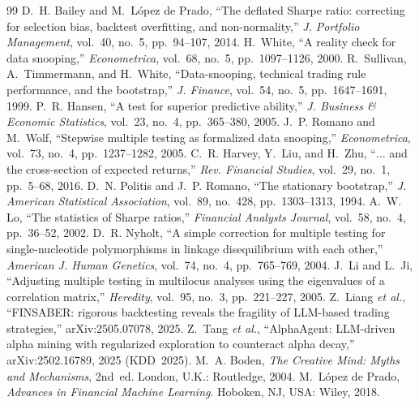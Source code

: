 \documentclass[conference]{IEEEtran}
\begin{document}
\begin{thebibliography}{99}
 D.~H. Bailey and M.~L\'opez de Prado, ``The deflated Sharpe ratio: correcting
for selection bias, backtest overfitting, and non-normality,'' \emph{J. Portfolio
Management}, vol.~40, no.~5, pp.~94--107, 2014.
 H.~White, ``A reality check for data snooping,'' \emph{Econometrica}, vol.~68,
no.~5, pp.~1097--1126, 2000.
 R.~Sullivan, A.~Timmermann, and H.~White, ``Data-snooping, technical trading
rule performance, and the bootstrap,'' \emph{J. Finance}, vol.~54, no.~5, pp.~1647--1691, 1999.
 P.~R. Hansen, ``A test for superior predictive ability,'' \emph{J. Business \&
Economic Statistics}, vol.~23, no.~4, pp.~365--380, 2005.
 J.~P. Romano and M.~Wolf, ``Stepwise multiple testing as formalized data
snooping,'' \emph{Econometrica}, vol.~73, no.~4, pp.~1237--1282, 2005.
 C.~R. Harvey, Y.~Liu, and H.~Zhu, ``$\ldots$ and the cross-section of expected
returns,'' \emph{Rev. Financial Studies}, vol.~29, no.~1, pp.~5--68, 2016.
 D.~N. Politis and J.~P. Romano, ``The stationary bootstrap,'' \emph{J.
American Statistical Association}, vol.~89, no.~428, pp.~1303--1313, 1994.
 A.~W. Lo, ``The statistics of Sharpe ratios,'' \emph{Financial Analysts Journal},
vol.~58, no.~4, pp.~36--52, 2002.
 D.~R. Nyholt, ``A simple correction for multiple testing for single-nucleotide
polymorphisms in linkage disequilibrium with each other,'' \emph{American J. Human Genetics},
vol.~74, no.~4, pp.~765--769, 2004.
 J.~Li and L.~Ji, ``Adjusting multiple testing in multilocus analyses using the
eigenvalues of a correlation matrix,'' \emph{Heredity}, vol.~95, no.~3, pp.~221--227, 2005.
  Z.~Liang \emph{et al.}, ``FINSABER: rigorous backtesting reveals the fragility of
  LLM-based trading strategies,'' arXiv:2505.07078, 2025.
  Z.~Tang \emph{et al.}, ``AlphaAgent: LLM-driven alpha mining with regularized exploration to
  counteract alpha decay,'' arXiv:2502.16789, 2025 (KDD~2025).
 M.~A. Boden, \emph{The Creative Mind: Myths and Mechanisms}, 2nd~ed. London,
U.K.: Routledge, 2004.
 M.~L\'opez de Prado, \emph{Advances in Financial Machine Learning}. Hoboken,
NJ, USA: Wiley, 2018.
\end{thebibliography}
\end{document}
